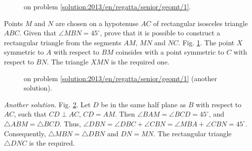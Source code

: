 \ifsolution
\begin{figure}\centering
    \caption{on problem \ref{solution:2013/en/regatta/senior/geomt/1}.}
    \label{fig:solution:2013/en/regatta/senior/geomt/1}
\end{figure}
\fi %

\problem
Points $M$ and $N$ are chosen on a hypotenuse $AC$ of rectangular isosceles
triangle $ABC$.
Given that $\angle MBN = 45^\circ$, prove that it is possible to construct a
rectangular triangle from the segments $AM$, $MN$ and $NC$.
\solution
\label{solution:2013/en/regatta/senior/geomt/1}%
Fig. \ref{fig:solution:2013/en/regatta/senior/geomt/1}.
The point $X$ symmetric to $A$ with respect to $BM$ coinsides with a point
symmetric to $C$ with respect to $BN$.
The triangle $XMN$ is the required one.
\par
\begin{figure}\centering
    \caption{on problem \ref{solution:2013/en/regatta/senior/geomt/1}
        (another solution).}
    \label{fig:solution:2013/en/regatta/senior/geomt/1/another}
\end{figure}
\emph{Another solution.}
Fig. \ref{fig:solution:2013/en/regatta/senior/geomt/1/another}.
Let $D$ be in the same half plane as $B$ with respect to $AC$, such that
$CD \perp AC$, $CD = AM$.
Then $\angle BAM = \angle BCD = 45^\circ$, and $\triangle ABM = \triangle BCD$.
Thus,
\(
    \angle DBN = \angle DBC + \angle CBN
=
    \angle MBA + \angle CBN = 45^\circ
\).
Consequently, $\triangle MBN = \triangle DBN$ and $DN = MN$.
The rectangular triangle $\triangle DNC$ is the required.
\endproblem
